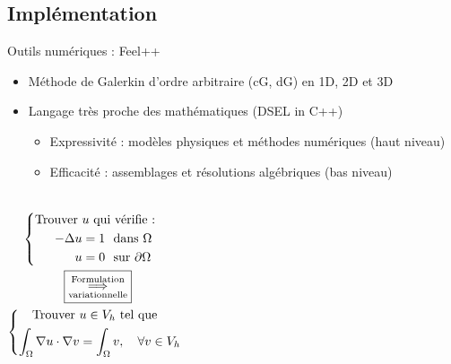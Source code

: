 

\subsection{Implémentation}
\begin{frame}{Outils numériques : Feel++ }

  \begin{itemize}
  \item Méthode de Galerkin d'ordre arbitraire (cG, dG) en 1D, 2D et 3D%
  \item Langage très proche des mathématiques (DSEL in C++)
    \begin{itemize}
    \item Expressivité : { \scriptsize modèles physiques et méthodes numériques (\alert{haut niveau})} \\
    \item Efficacité : { \scriptsize assemblages et résolutions algébriques (\alert{bas niveau})}
    \end{itemize}
  \end{itemize}


      \begin{columns}
        \scriptsize
        \vspace*{-0.07\textwidth}

        \begin{eqnarray*}
          \left\{
          \begin{aligned}
            \text{Trouver } &u \text{ qui vérifie :} \quad\quad \\
            -\Delta u &= 1 \ \ \text{dans} \ \Omega \\
            u &= 0 \ \ \text{sur} \ \partial\Omega
          \end{aligned}
          \right. \\
          \fbox{$\underset{\text{variationnelle}}{\overset{\text{Formulation}}{\Longrightarrow}}$} \quad\quad\quad\quad \\
          \left\{
          \begin{aligned}
            \text{Trouver } &u\in V_h \text{ tel que } \\
            \int_\Omega \nabla u \cdot \nabla v &= \int_\Omega v , \quad \forall v \in V_h
          \end{aligned}
          \right.
        \end{eqnarray*}


\end{columns}
\end{frame}
